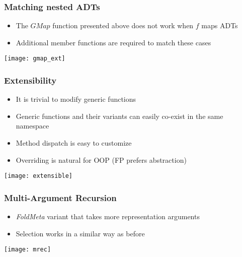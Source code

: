 \documentclass{beamer}
\begin{document}
\begin{frame}

  \frametitle{Matching nested ADTs}

  \begin{itemize}

  \item The $GMap$ function presented above does not work when $f$ maps ADTs
  \item Additional member functions are required to match these cases
  \end{itemize}

  \centering\texttt{[image: gmap\_ext]}
  
\end{frame}

\begin{frame}
  \frametitle{Extensibility}
  \begin{itemize}
  \item It is trivial to modify generic functions
  \item Generic functions and their variants can easily co-exist in
    the same namespace
  \item Method dispatch is easy to customize
  \item Overriding is natural for OOP (FP prefers abstraction)
  \end{itemize}
  
  \centering\texttt{[image: extensible]}
\end{frame}

\begin{frame}
  \frametitle{Multi-Argument Recursion}
  \begin{itemize}
  \item \emph{FoldMeta} variant that takes more representation
    arguments
  \item Selection works in a similar way as before
  \end{itemize}
  
  \texttt{[image: mrec]}
  
\end{frame}
\end{document}
